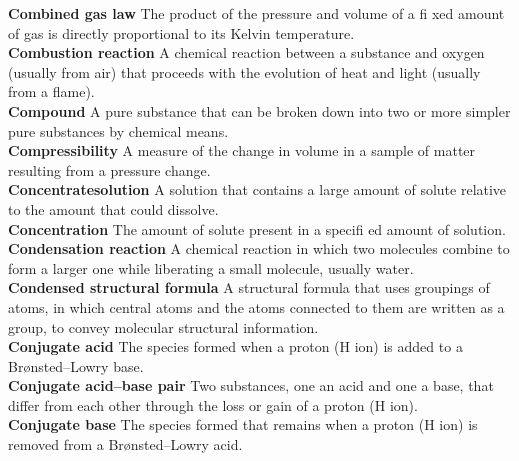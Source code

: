 \documentclass[10pt, roman]{article}
\begin{document}
\begin{minipage}[c]{0.30\textwidth}
\textbf{Combined gas law} The product of the pressure and volume of a fi xed amount of gas is directly proportional to its Kelvin temperature. \\
\textbf{Combustion reaction} A chemical reaction between a substance and oxygen (usually from air) that proceeds with the evolution of heat and light (usually from a flame). \\
\textbf{Compound} A pure substance that can be broken down into two or more simpler pure substances by chemical means. \\
\textbf{Compressibility} A measure of the change in volume in a sample of matter resulting from a pressure change. \\
\textbf{Concentratesolution} A solution that contains a large amount of solute relative to the amount that could dissolve. \\
\textbf{Concentration} The amount of solute present in a specifi ed amount of solution. \\
\textbf{Condensation reaction} A chemical reaction in which two molecules combine to form a larger one while liberating a small molecule, usually water. \\
\textbf{Condensed structural formula} A structural formula that uses groupings of atoms, in which central atoms and the atoms connected to them are written as a group, to convey molecular structural information. \\
\textbf{Conjugate acid} The species formed when a proton (H ion) is added to a Brønsted–Lowry base. \\
\textbf{Conjugate acid–base pair} Two substances, one an acid and one a base, that differ from each other through the loss or gain of a proton (H ion). \\
\textbf{Conjugate base} The species formed that remains when a proton (H ion) is removed from a Brønsted–Lowry acid. \\
\end{minipage}%
\hfill
\end{document}
